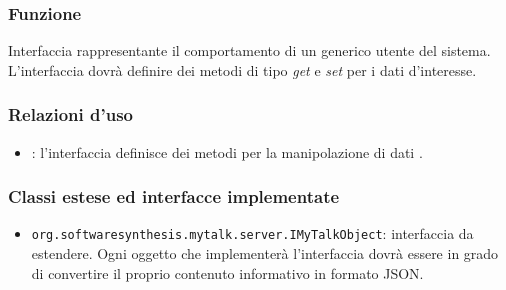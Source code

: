 
\subsubsection*{Funzione}
Interfaccia rappresentante il comportamento di un generico utente del sistema. L'interfaccia dovrà definire dei metodi di tipo \textit{get} e \textit{set} per i dati d'interesse.

\subsubsection*{Relazioni d'uso}

\begin{itemize}
	\item {}: l'interfaccia definisce dei metodi per la manipolazione di dati .
\end{itemize}

\subsubsection*{Classi estese ed interfacce implementate}
\begin{itemize}
	\item \texttt{org.softwaresynthesis.mytalk.server.IMyTalkObject}: interfaccia da estendere. Ogni oggetto che implementerà l'interfaccia  dovrà essere in grado di convertire il proprio contenuto informativo in formato JSON.
\end{itemize}


